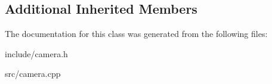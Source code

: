 \subsection*{Additional Inherited Members}


The documentation for this class was generated from the following files\+:\begin{DoxyCompactItemize}
\item 
include/camera.\+h\item 
src/camera.\+cpp\end{DoxyCompactItemize}
